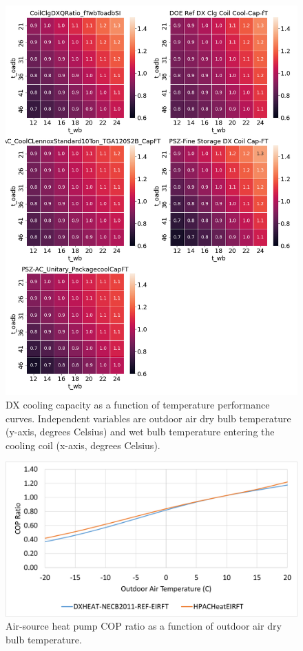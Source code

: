 \begin{figure}
    \centering \includegraphics[width=1.0\textwidth]{figures/CAPFT.png}
    \caption[DX cooling capacity as a function of temperature performance curves]{DX cooling capacity as a function of temperature performance curves. Independent variables are outdoor air dry bulb temperature (y-axis, degrees Celsius) and wet bulb temperature entering the cooling coil (x-axis, degrees Celsius).}
    \label{fig:dx_capft}
\end{figure}

\begin{figure}
    \centering \includegraphics[width=1.0\textwidth]{figures/ashp_eirft.png}
    \caption[Air-source heat pump COP ratio as a function of outdoor air dry bulb temperature]{Air-source heat pump COP ratio as a function of outdoor air dry bulb temperature.}
    \label{fig:ashp_eirft}
\end{figure}

